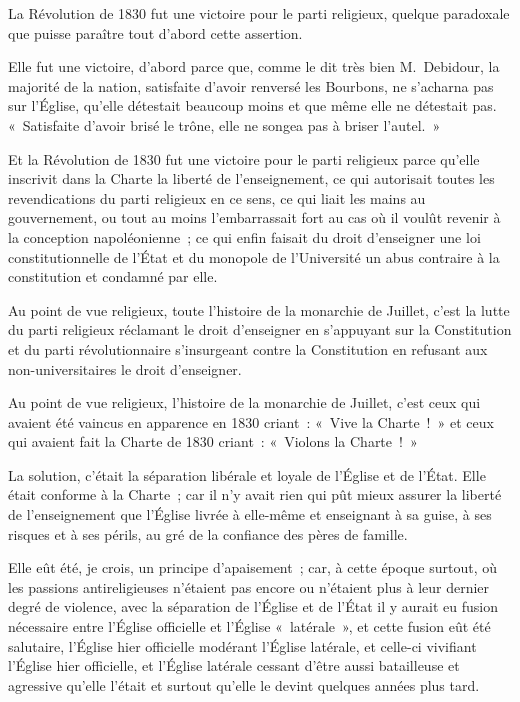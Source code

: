 \documentclass[french,twoside]{book} %
\begin{document}
\noindent La Révolution de 1830 fut une victoire pour le parti religieux, quelque paradoxale que puisse paraître tout d’abord cette assertion.\par
Elle fut une victoire, d’abord parce que, comme le dit très bien M. Debidour, la majorité de la nation, satisfaite d’avoir renversé les Bourbons, ne s’acharna pas sur l’Église, qu’elle détestait beaucoup moins et que même elle ne détestait pas. « Satisfaite d’avoir brisé le trône, elle ne songea pas à briser l’autel. »\par
Et la Révolution de 1830 fut une victoire pour le parti religieux parce qu’elle inscrivit dans la Charte la liberté de l’enseignement, ce qui autorisait toutes les revendications du parti religieux en ce sens, ce qui liait les mains au gouvernement, ou tout au moins l’embarrassait fort au cas où il voulût revenir à la conception napoléonienne ; ce qui enfin faisait du droit d’enseigner  une loi constitutionnelle de l’État et du monopole de l’Université un abus contraire à la constitution et condamné par elle.\par
Au point de vue religieux, toute l’histoire de la monarchie de Juillet, c’est la lutte du parti religieux réclamant le droit d’enseigner en s’appuyant sur la Constitution et du parti révolutionnaire s’insurgeant contre la Constitution en refusant aux non-universitaires le droit d’enseigner.\par
Au point de vue religieux, l’histoire de la monarchie de Juillet, c’est ceux qui avaient été vaincus en apparence en 1830 criant : « Vive la Charte ! » et ceux qui avaient fait la Charte de 1830 criant : « Violons la Charte ! »\par
La solution, c’était la séparation libérale et loyale de l’Église et de l’État. Elle était conforme à la Charte ; car il n’y avait rien qui pût mieux assurer la liberté de l’enseignement que l’Église livrée à elle-même et enseignant à sa guise, à ses risques et à ses périls, au gré de la confiance des pères de famille.\par
Elle eût été, je crois, un principe d’apaisement ; car, à cette époque surtout, où les passions antireligieuses n’étaient pas encore ou n’étaient plus à leur dernier degré de violence, avec la séparation de l’Église et de l’État il y aurait eu fusion nécessaire entre l’Église officielle et l’Église « latérale »,  et cette fusion eût été salutaire, l’Église hier officielle modérant l’Église latérale, et celle-ci vivifiant l’Église hier officielle, et l’Église latérale cessant d’être aussi batailleuse et agressive qu’elle l’était et surtout qu’elle le devint quelques années plus tard.\par
\end{document}
